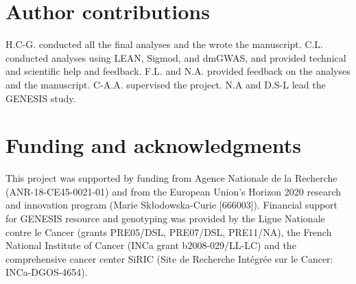 \documentclass[twocolumn, 11pt]{article}
\begin{document}
\section*{Author contributions}

H.C-G. conducted all the final analyses and the wrote the manuscript. C.L. conducted analyses using LEAN, Sigmod, and dmGWAS, and provided technical and scientific help and feedback. F.L. and N.A. provided feedback on the analyses and the manuscript. C-A.A. supervised the project. N.A and D.S-L lead the GENESIS study.

\section*{Funding and acknowledgments}

This project was supported by funding from Agence Nationale de la Recherche (ANR-18-CE45-0021-01) and from the European Union’s Horizon 2020 research and innovation program (Marie Skłodowska-Curie [666003]). Financial support for GENESIS resource and genotyping was provided by the Ligue Nationale contre le Cancer (grants PRE05/DSL, PRE07/DSL, PRE11/NA), the French National Institute of Cancer (INCa grant b2008-029/LL-LC) and the comprehensive cancer center SiRIC (Site de Recherche Intégrée sur le Cancer: INCa-DGOS-4654).
\end{document}
